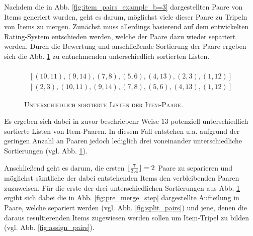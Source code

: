 Nachdem die in Abb. \ref{fig:item_pairs_example_b=3} dargestellten Paare von Items generiert wurden, geht es darum,
möglichst viele dieser Paare zu Tripeln von Items zu mergen. Zunächst muss allerdings basierend auf dem entwickelten Rating-System
entschieden werden, welche der Paare dazu wieder separiert werden. Durch die Bewertung und anschließende Sortierung der Paare
ergeben sich die Abb. \ref{fig:lists_of_pairs} zu entnehmenden unterschiedlich sortierten Listen.
\begin{figure}[H]
\begin{gather*}
  [(2, 3), (4, 13), (10, 11), (9, 14), (7, 8), (5, 6), (1, 12)] \\
  [(10, 11), (9, 14), (7, 8), (5, 6), (4, 13), (2, 3), (1, 12)] \\
  [(2, 3), (10, 11), (9, 14), (7, 8), (5, 6), (4, 13), (1, 12)]
\end{gather*}
\caption{\textsc{Unterschiedlich sortierte Listen der Item-Paare}.}
\label{fig:lists_of_pairs}
\end{figure}
Es ergeben sich dabei in zuvor beschriebenr Weise $13$ potenziell unterschiedlich sortierte Listen von Item-Paaren.
In diesem Fall entstehen u.a. aufgrund der geringen Anzahl an Paaren jedoch lediglich drei voneinander unterschiedliche
Sortierungen (vgl. Abb. \ref{fig:lists_of_pairs}).

Anschließend geht es darum, die ersten $\lfloor\frac{7}{3.4}\rfloor = 2$ Paare zu separieren und möglichst sämtliche der dabei entstehenden
Items den verbleibenden Paaren zuzuweisen. Für die erste der drei unterschiedlichen Sortierungen aus Abb. \ref{fig:lists_of_pairs}
ergibt sich dabei die in Abb. \ref{fig:pre_merge_step} dargestellte Aufteilung in Paare, welche separiert werden
(vgl. Abb. \ref{fig:split_pairs}) und jene, denen die daraus resultierenden Items zugewiesen werden sollen um Item-Tripel zu bilden
(vgl. Abb. \ref{fig:assign_pairs}).

